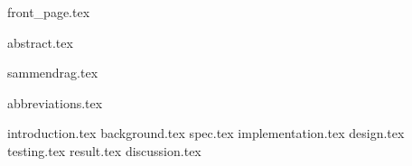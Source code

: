\documentclass[dvipsnames, b5paper, twoside, openright]{report}
\begin{document}
{front_page.tex}

%

\setcounter{page}{1}
\setcounter{tocdepth}{3}

\let\cleardoublepage\clearpage
{abstract.tex}


\let\cleardoublepage\clearpage
{sammendrag.tex}

\let\cleardoublepage\clearpage
{abbreviations.tex}

\let\cleardoublepage\clearpage
\tableofcontents
{}

\cleardoublepage



\setcounter{page}{1}
\fancyhead[R]{\itshape \nouppercase \rightmark}
\pagestyle{fancy}

\let\cleardoublepage\clearpage
{introduction.tex}
\let\cleardoublepage\clearpage
{background.tex}
\let\cleardoublepage\clearpage
{spec.tex}
\let\cleardoublepage\clearpage
{implementation.tex}
\let\cleardoublepage\clearpage
{design.tex}
\let\cleardoublepage\clearpage
{testing.tex}
\let\cleardoublepage\clearpage
{result.tex}
\let\cleardoublepage\clearpage
{discussion.tex}


\let\cleardoublepage\clearpage
\begin{appendices}
\end{appendices}

\let\cleardoublepage\clearpage
\printbibliography
{}
\end{document}
